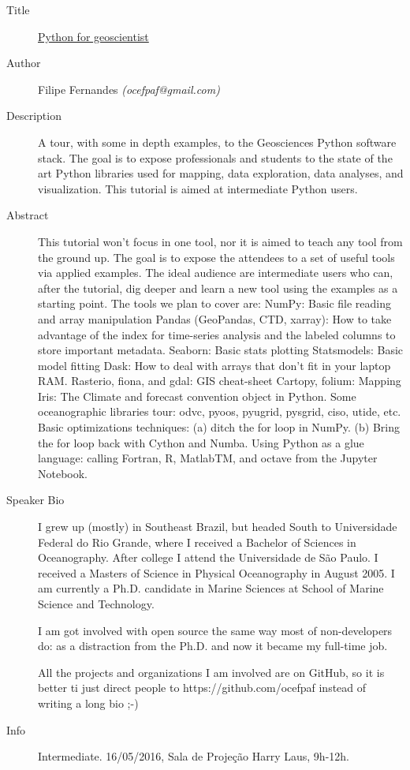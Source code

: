 \begin{description}
   \item[Title] \underline{Python for geoscientist}
   \item[Author] Filipe Fernandes \emph{(ocefpaf@gmail.com)}
   \item[Description] A tour, with some in depth examples, to the Geosciences Python software stack. The goal is to expose professionals and students to the state of the art Python libraries used for mapping, data exploration, data analyses, and visualization. This tutorial is aimed at intermediate Python users. 
   \item[Abstract] This tutorial won't focus in one tool, nor it is aimed to teach any tool from the ground up. The goal is to expose the attendees to a set of useful tools via applied examples. The ideal audience are intermediate users who can, after the tutorial, dig deeper and learn a new tool using the examples as a starting point. The tools we plan to cover are:
    NumPy: Basic file reading and array manipulation
    Pandas (GeoPandas, CTD, xarray): How to take advantage of the index for time-series analysis and the labeled columns to store important metadata.
    Seaborn: Basic stats plotting
    Statsmodels: Basic model fitting
    Dask: How to deal with arrays that don't fit in your laptop RAM.
    Rasterio, fiona, and gdal: GIS cheat-sheet
    Cartopy, folium: Mapping
    Iris: The Climate and forecast convention object in Python.
    Some oceanographic libraries tour: odvc, pyoos, pyugrid, pysgrid, ciso, utide, etc.
    Basic optimizations techniques: (a) ditch the for loop in NumPy. (b) Bring the for loop back with Cython and Numba.
    Using Python as a glue language: calling Fortran, R, MatlabTM, and octave from the Jupyter Notebook.
    \item[Speaker Bio] I grew up (mostly) in Southeast Brazil, but headed South to Universidade Federal do Rio Grande, where I received a Bachelor of Sciences in Oceanography. After college I attend the Universidade de São Paulo. I received a Masters of Science in Physical Oceanography in August 2005. I am currently a Ph.D. candidate in Marine Sciences at School of Marine Science and Technology.

I am got involved with open source the same way most of non-developers do: as a distraction from the Ph.D. and now it became my full-time job.

All the projects and organizations I am involved are on GitHub, so it is better ti just direct people to https://github.com/ocefpaf instead of writing a long bio ;-)
    \item[Info] Intermediate. 16/05/2016, Sala de Projeção Harry Laus, 9h-12h.
\end{description} 
